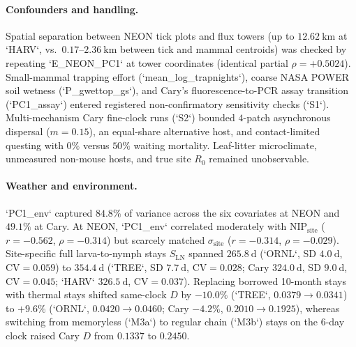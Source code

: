 \paragraph{Confounders and handling.}
Spatial separation between NEON tick plots and flux towers (up to $12.62\ \mathrm{km}$ at `HARV`, vs.\ $0.17$--$2.36\ \mathrm{km}$ between tick and mammal centroids) was checked by repeating `E\_NEON\_PC1` at tower coordinates (identical partial $\rho = +0.5024$). Small-mammal trapping effort (`mean\_log\_trapnights`), coarse NASA POWER soil wetness (`P\_gwettop\_gs`), and Cary's fluorescence-to-PCR assay transition (`PC1\_assay`) entered registered non-confirmatory sensitivity checks (`S1`). Multi-mechanism Cary fine-clock runs (`S2`) bounded $4$-patch asynchronous dispersal ($m = 0.15$), an equal-share alternative host, and contact-limited questing with $0\%$ versus $50\%$ waiting mortality. Leaf-litter microclimate, unmeasured non-mouse hosts, and true site $R_0$ remained unobservable.

\paragraph{Weather and environment.}
`PC1\_env` captured $84.8\%$ of variance across the six covariates at NEON and $49.1\%$ at Cary. At NEON, `PC1\_env` correlated moderately with $\mathrm{NIP}_{\mathrm{site}}$ ($r = -0.562$, $\rho = -0.314$) but scarcely matched $\sigma_{\mathrm{site}}$ ($r = -0.314$, $\rho = -0.029$). Site-specific full larva-to-nymph stays $S_{\mathrm{LN}}$ spanned $265.8\ \mathrm{d}$ (`ORNL`, SD $4.0\ \mathrm{d}$, $\mathrm{CV} = 0.059$) to $354.4\ \mathrm{d}$ (`TREE`, SD $7.7\ \mathrm{d}$, $\mathrm{CV} = 0.028$; Cary $324.0\ \mathrm{d}$, SD $9.0\ \mathrm{d}$, $\mathrm{CV} = 0.045$; `HARV` $326.5\ \mathrm{d}$, $\mathrm{CV} = 0.037$). Replacing borrowed 10-month stays with thermal stays shifted same-clock $D$ by $-10.0\%$ (`TREE`, $0.0379 \to 0.0341$) to $+9.6\%$ (`ORNL`, $0.0420 \to 0.0460$; Cary $-4.2\%$, $0.2010 \to 0.1925$), whereas switching from memoryless (`M3a`) to regular chain (`M3b`) stays on the 6-day clock raised Cary $D$ from $0.1337$ to $0.2450$.

